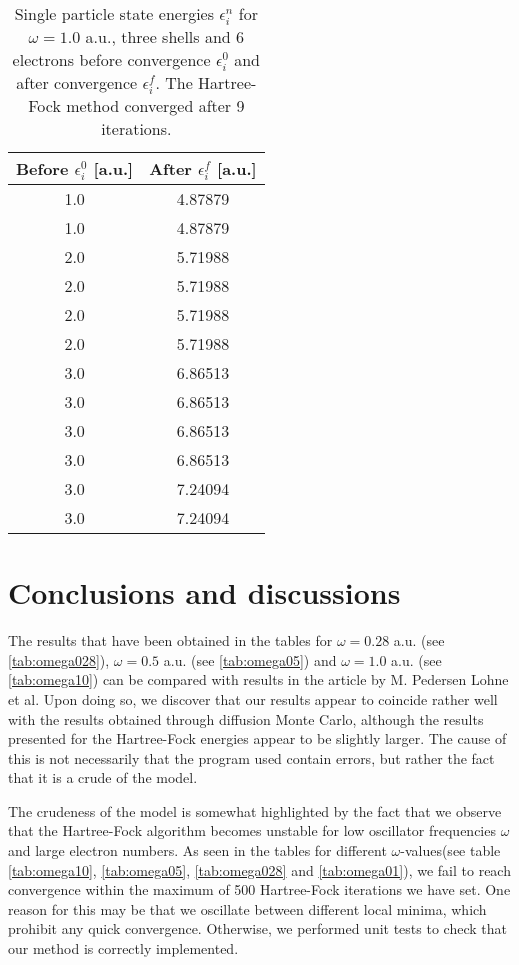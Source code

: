 \documentclass[11pt]{article}
\begin{document}
\begin{table}[H]
	\centering
	\caption{Single particle state energies $\epsilon_i^n$ for $\omega=1.0$ a.u., three shells and 6 electrons before convergence $\epsilon^0_i$ and after convergence $\epsilon^f_i$. The Hartree-Fock method converged after 9 iterations.}
	\begin{tabular}{c c}
		\\ \hline \hline
		Before $\epsilon^0_i$ [a.u.] & After $\epsilon^f_i$ [a.u.] \\ \hline
		1.0 & 4.87879 \\
		1.0 & 4.87879 \\
		2.0 & 5.71988 \\
		2.0 & 5.71988 \\
		2.0 & 5.71988 \\
		2.0 & 5.71988 \\
		3.0 & 6.86513 \\ 
		3.0 & 6.86513 \\ 
		3.0 & 6.86513 \\ 
		3.0 & 6.86513 \\ 
		3.0 & 7.24094 \\
		3.0 & 7.24094 \\
        \hline \hline
	\end{tabular}
	\label{tab:sps-energies}
\end{table}

\section{Conclusions and discussions}
The results that have been obtained in the tables for $\omega=0.28$ a.u. (see \ref{tab:omega028}), $\omega=0.5$ a.u. (see \ref{tab:omega05}) and $\omega=1.0$ a.u. (see \ref{tab:omega10}) can be compared with results in the article by M. Pedersen Lohne et al. \cite{PhysRevB.84.115302} Upon doing so, we discover that our results appear to coincide rather well with the results obtained through diffusion Monte Carlo, although the results presented for the Hartree-Fock energies appear to be slightly larger. The cause of this is not necessarily that the program used contain errors, but rather the fact that it is a crude of the model.

The crudeness of the model is somewhat highlighted by the fact that we observe that the Hartree-Fock algorithm becomes unstable for low oscillator frequencies $\omega$ and large electron numbers. As seen in the tables for different $\omega$-values(see table \ref{tab:omega10}, \ref{tab:omega05}, \ref{tab:omega028} and \ref{tab:omega01}), we fail to reach convergence within the maximum of 500 Hartree-Fock iterations we have set. One reason for this may be that we oscillate between different local minima, which prohibit any quick convergence. Otherwise, we performed unit tests to check that our method is correctly implemented.
\end{document}

